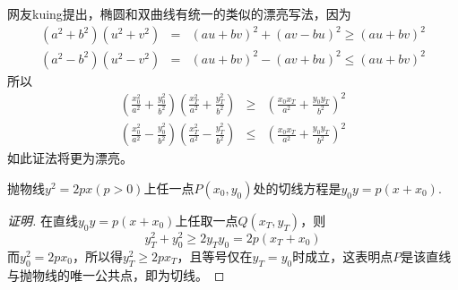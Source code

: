 网友kuing提出，椭圆和双曲线有统一的类似的漂亮写法，因为
\begin{eqnarray*}
  (a^2+b^2)(u^2+v^2) & = & (au+bv)^2+(av-bu)^2 \geqslant (au+bv)^2 \\
  (a^2-b^2)(u^2-v^2) & = & (au+bv)^2-(av+bu)^2 \leqslant (au+bv)^2 
\end{eqnarray*}
所以
\begin{eqnarray*}
  \left( \frac{x_0^2}{a^2}+\frac{y_0^2}{b^2} \right) \left( \frac{x_T^2}{a^2}+\frac{y_T^2}{b^2} \right) & \geqslant & \left( \frac{x_0x_T}{a^2}+\frac{y_0y_T}{b^2} \right)^2 \\
  \left( \frac{x_0^2}{a^2}-\frac{y_0^2}{b^2} \right) \left( \frac{x_T^2}{a^2}-\frac{y_T^2}{b^2} \right) & \leqslant & \left( \frac{x_0x_T}{a^2}+\frac{y_0y_T}{b^2} \right)^2 
\end{eqnarray*}
如此证法将更为漂亮。

\begin{theorem}
  抛物线$y^2=2px(p>0)$上任一点$P(x_0,y_0)$处的切线方程是$y_0y=p(x+x_0)$.
\end{theorem}

\begin{proof}[证明]
  在直线$y_0y=p(x+x_0)$上任取一点$Q(x_T,y_T)$，则
  \[ y_T^2+y_0^2 \geqslant 2y_Ty_0=2p(x_T+x_0) \]
  而$y_0^2=2px_0$，所以得$y_T^2 \geqslant 2px_T$，且等号仅在$y_T=y_0$时成立，这表明点$P$是该直线与抛物线的唯一公共点，即为切线。
\end{proof}

